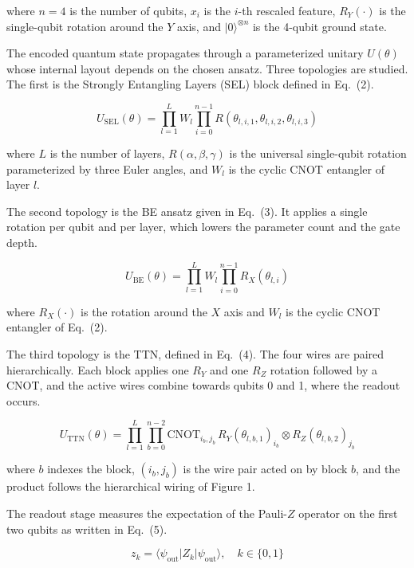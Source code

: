 \documentclass[conference]{IEEEtran}
\begin{document}
where $n = 4$ is the number of qubits, $x_i$ is the $i$-th rescaled feature, $R_Y(\cdot)$ is the single-qubit rotation around the $Y$ axis, and $|0\rangle^{\otimes n}$ is the 4-qubit ground state.

The encoded quantum state propagates through a parameterized unitary $U(\theta)$ whose internal layout depends on the chosen ansatz. Three topologies are studied. The first is the Strongly Entangling Layers (SEL) block defined in Eq.~(2).

\begin{equation}
U_{\text{SEL}}(\theta) = \prod_{l=1}^{L} W_l \prod_{i=0}^{n-1} R(\theta_{l,i,1}, \theta_{l,i,2}, \theta_{l,i,3})
\end{equation}

where $L$ is the number of layers, $R(\alpha, \beta, \gamma)$ is the universal single-qubit rotation parameterized by three Euler angles, and $W_l$ is the cyclic CNOT entangler of layer $l$.

The second topology is the BE ansatz given in Eq.~(3). It applies a single rotation per qubit and per layer, which lowers the parameter count and the gate depth.

\begin{equation}
U_{\text{BE}}(\theta) = \prod_{l=1}^{L} W_l \prod_{i=0}^{n-1} R_X(\theta_{l,i})
\end{equation}

where $R_X(\cdot)$ is the rotation around the $X$ axis and $W_l$ is the cyclic CNOT entangler of Eq.~(2).

The third topology is the TTN, defined in Eq.~(4). The four wires are paired hierarchically. Each block applies one $R_Y$ and one $R_Z$ rotation followed by a CNOT, and the active wires combine towards qubits 0 and 1, where the readout occurs.

\begin{equation}
U_{\text{TTN}}(\theta) = \prod_{l=1}^{L} \prod_{b=0}^{n-2} \text{CNOT}_{i_b,j_b}\, R_Y(\theta_{l,b,1})_{i_b} \otimes R_Z(\theta_{l,b,2})_{j_b}
\end{equation}

where $b$ indexes the block, $(i_b, j_b)$ is the wire pair acted on by block $b$, and the product follows the hierarchical wiring of Figure 1.

The readout stage measures the expectation of the Pauli-$Z$ operator on the first two qubits as written in Eq.~(5).

\begin{equation}
z_k = \langle \psi_{\text{out}} | Z_k | \psi_{\text{out}} \rangle, \quad k \in \{0, 1\}
\end{equation}
\end{document}
